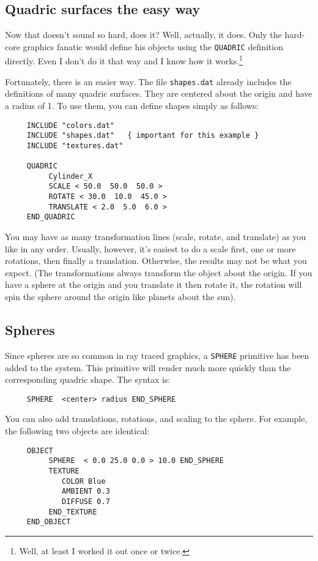 \subsection{Quadric surfaces the easy way}

Now that doesn't sound so hard, does it?  Well, actually, it does.
Only the hard-core graphics fanatic would define his objects using the
{\tt QUADRIC} definition directly.  Even I don't do it that way and I
know how it works.\footnote{Well, at least I worked it out once
or twice.}

Fortunately, there is an easier way.
The file {\tt shapes.dat} already
includes the definitions of many quadric surfaces.  They are centered
about the origin {\tt < 0 0 0 >} and have a radius of 1.  To use them,
you can define shapes simply as follows:
\begin{verbatim}
     INCLUDE "colors.dat"
     INCLUDE "shapes.dat"   { important for this example }
     INCLUDE "textures.dat"

     QUADRIC
          Cylinder_X
          SCALE < 50.0  50.0  50.0 >
          ROTATE < 30.0  10.0  45.0 >
          TRANSLATE < 2.0  5.0  6.0 >
     END_QUADRIC
\end{verbatim}
You may have as many transformation lines (scale, rotate, and translate) as
you like in any order.  Usually, however, it's easiest to do a scale first,
one or more rotations, then finally a translation.  Otherwise, the results may
not be what you expect. (The transformations always transform the object about
the origin.  If you have a sphere at the origin and you translate it then
rotate it, the rotation will spin the sphere around the origin like planets
about the sun).

\subsection{Spheres}

Since spheres are so common in ray traced graphics, a {\tt SPHERE}
primitive has been added to the system.  This primitive will render
much more quickly than the corresponding quadric shape.  The syntax
is:
\begin{verbatim}
     SPHERE  <center> radius END_SPHERE
\end{verbatim}

You can also add translations, rotations, and scaling to the sphere. For
example, the following two objects are identical:
\begin{verbatim}
     OBJECT
          SPHERE  < 0.0 25.0 0.0 > 10.0 END_SPHERE
          TEXTURE
             COLOR Blue
             AMBIENT 0.3
             DIFFUSE 0.7
          END_TEXTURE
     END_OBJECT
\end{verbatim}

